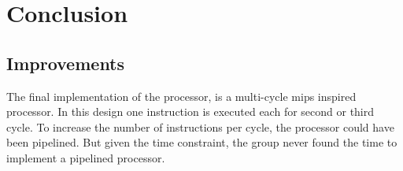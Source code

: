 \chapter{Conclusion}

\section{Improvements}

The final implementation of the processor, is a multi-cycle mips inspired processor.
In this design one instruction is executed each for second or third cycle.
To increase the number of instructions per cycle, the processor could have been pipelined.
But given the time constraint, the group never found the time to implement a pipelined processor.
